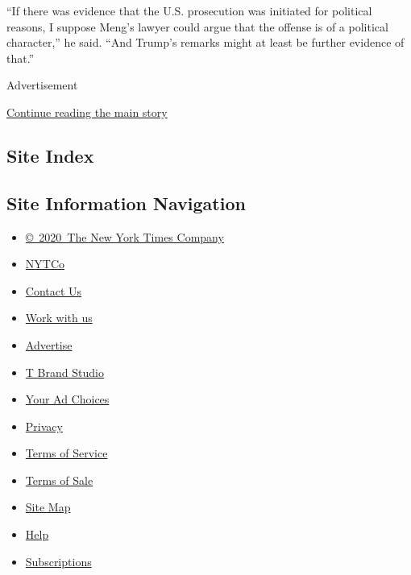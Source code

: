 ``If there was evidence that the U.S. prosecution was initiated for
political reasons, I suppose Meng's lawyer could argue that the offense
is of a political character,'' he said. ``And Trump's remarks might at
least be further evidence of that.''

Advertisement

\protect\hyperlink{after-bottom}{Continue reading the main story}

\hypertarget{site-index}{%
\subsection{Site Index}\label{site-index}}

\hypertarget{site-information-navigation}{%
\subsection{Site Information
Navigation}\label{site-information-navigation}}

\begin{itemize}
\tightlist
\item
  \href{https://help.nytimes.com/hc/en-us/articles/115014792127-Copyright-notice}{©~2020~The
  New York Times Company}
\end{itemize}

\begin{itemize}
\tightlist
\item
  \href{https://www.nytco.com/}{NYTCo}
\item
  \href{https://help.nytimes.com/hc/en-us/articles/115015385887-Contact-Us}{Contact
  Us}
\item
  \href{https://www.nytco.com/careers/}{Work with us}
\item
  \href{https://nytmediakit.com/}{Advertise}
\item
  \href{http://www.tbrandstudio.com/}{T Brand Studio}
\item
  \href{https://www.nytimes.com/privacy/cookie-policy\#how-do-i-manage-trackers}{Your
  Ad Choices}
\item
  \href{https://www.nytimes.com/privacy}{Privacy}
\item
  \href{https://help.nytimes.com/hc/en-us/articles/115014893428-Terms-of-service}{Terms
  of Service}
\item
  \href{https://help.nytimes.com/hc/en-us/articles/115014893968-Terms-of-sale}{Terms
  of Sale}
\item
  \href{https://spiderbites.nytimes.com}{Site Map}
\item
  \href{https://help.nytimes.com/hc/en-us}{Help}
\item
  \href{https://www.nytimes.com/subscription?campaignId=37WXW}{Subscriptions}
\end{itemize}
